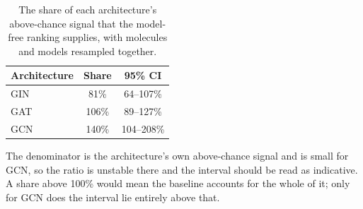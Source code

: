 \begin{table}[htbp]
\centering
\caption{The share of each architecture's above-chance signal that the model-free ranking supplies, with molecules and models resampled together.}
\label{tab:shares}
\small
\setlength{\tabcolsep}{4pt}
\begin{tabular}{lcc}
\toprule
Architecture & Share & 95\% CI \\
\midrule
GIN & 81\% & 64--107\% \\
GAT & 106\% & 89--127\% \\
GCN & 140\% & 104--208\% \\
\bottomrule
\end{tabular}
\begin{flushleft}\footnotesize The denominator is the architecture's own above-chance signal and is small for GCN, so the ratio is unstable there and the interval should be read as indicative. A share above 100\% would mean the baseline accounts for the whole of it; only for GCN does the interval lie entirely above that.\end{flushleft}
\end{table}
